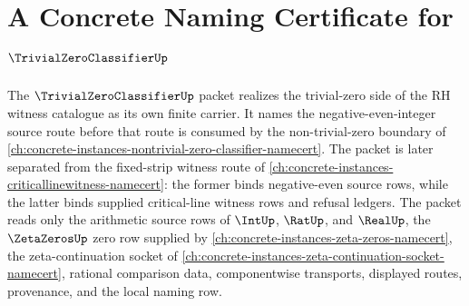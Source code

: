 \chapter{A Concrete Naming Certificate for $\TrivialZeroClassifierUp$}
\label{ch:concrete-instances-trivial-zero-classifier-namecert}

The $\TrivialZeroClassifierUp$ packet realizes the trivial-zero side of the RH witness catalogue as its own finite carrier. It names the negative-even-integer source route before that route is consumed by the non-trivial-zero boundary of \autoref{ch:concrete-instances-nontrivial-zero-classifier-namecert}. The packet is later separated from the fixed-strip witness route of \autoref{ch:concrete-instances-criticallinewitness-namecert}: the former binds negative-even source rows, while the latter binds supplied critical-line witness rows and refusal ledgers. The packet reads only the arithmetic source rows of $\IntUp$, $\RatUp$, and $\RealUp$, the $\ZetaZerosUp$ zero row supplied by \autoref{ch:concrete-instances-zeta-zeros-namecert}, the zeta-continuation socket of \autoref{ch:concrete-instances-zeta-continuation-socket-namecert}, rational comparison data, componentwise transports, displayed routes, provenance, and the local naming row.



